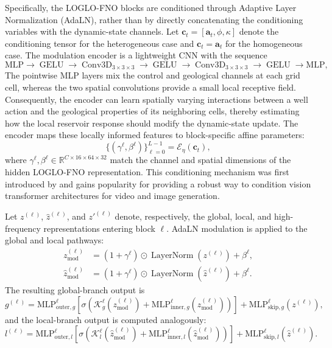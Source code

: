 \documentclass[pdflatex,sn-mathphys-ay]{sn-jnl}
\newcommand{\action}{\mathbf{a}}           %
\newcommand{\R}{\mathbb{R}}
\begin{document}
Specifically, the LOGLO-FNO blocks are conditioned through Adaptive Layer
Normalization (AdaLN), rather than by directly concatenating the conditioning
variables with the dynamic-state channels. Let
\(\mathbf{c}_t=[\action_t,\phi,\kappa]\) denote the conditioning tensor for the
heterogeneous case and \(\mathbf{c}_t=\action_t\) for the homogeneous case. The
modulation encoder is a lightweight CNN with the sequence
\[
  \text{MLP}
  \rightarrow \operatorname{GELU}
  \rightarrow \operatorname{Conv3D}_{3\times3\times3}
  \rightarrow \operatorname{GELU}
  \rightarrow \operatorname{Conv3D}_{3\times3\times3}
  \rightarrow \operatorname{GELU}
  \rightarrow \text{MLP},
\]
The pointwise MLP layers mix the
control and geological channels at each grid cell, whereas the two spatial
convolutions provide a small local receptive field. Consequently,
the encoder can learn spatially varying interactions between a well action and
the geological properties of its neighboring cells, thereby estimating how the
local reservoir response should modify the dynamic-state update. The encoder
maps these locally informed features to block-specific affine parameters:
\begin{equation}
  \{(\gamma^\ell,\beta^\ell)\}_{\ell=0}^{L-1}
  =
  \mathcal{E}_{\eta}(\mathbf{c}_t),
\end{equation}
where
\(\gamma^\ell,\beta^\ell\in\R^{C\times16\times64\times32}\) match the channel
and spatial dimensions of the hidden LOGLO-FNO representation. This
conditioning mechanism was first introduced by \cite{film} and gains popularity for providing
a robust way to condition vision transformer architectures for video and image generation.

Let \(z^{(\ell)}\), \(\hat{z}^{(\ell)}\), and \(z'^{(\ell)}\) denote,
respectively, the global, local, and high-frequency representations entering
block \(\ell\). AdaLN modulation is applied to the global and local pathways:
\begin{align}
  z_{\mathrm{mod}}^{(\ell)}
  &=
  (1+\gamma^\ell)\odot\operatorname{LayerNorm}(z^{(\ell)})
  +\beta^\ell,\\
  \hat{z}_{\mathrm{mod}}^{(\ell)}
  &=
  (1+\gamma^\ell)\odot\operatorname{LayerNorm}(\hat{z}^{(\ell)})
  +\beta^\ell.
\end{align}
The resulting global-branch output is
\begin{equation}
  g^{(\ell)}
  =
  \mathrm{MLP}_{\mathrm{outer},g}^{\ell}
  \left[
    \sigma\!\left(
      \mathcal{K}_{g}^{\ell}(z_{\mathrm{mod}}^{(\ell)})
      +
      \mathrm{MLP}_{\mathrm{inner},g}^{\ell}
      (z_{\mathrm{mod}}^{(\ell)})
    \right)
  \right]
  +
  \mathrm{MLP}_{\mathrm{skip},g}^{\ell}(z^{(\ell)}),
\end{equation}
and the local-branch output is computed analogously:
\begin{equation}
  l^{(\ell)}
  =
  \mathrm{MLP}_{\mathrm{outer},l}^{\ell}
  \left[
    \sigma\!\left(
      \mathcal{K}_{l}^{\ell}(\hat{z}_{\mathrm{mod}}^{(\ell)})
      +
      \mathrm{MLP}_{\mathrm{inner},l}^{\ell}
      (\hat{z}_{\mathrm{mod}}^{(\ell)})
    \right)
  \right]
  +
  \mathrm{MLP}_{\mathrm{skip},l}^{\ell}(\hat{z}^{(\ell)}).
\end{equation}
\end{document}
